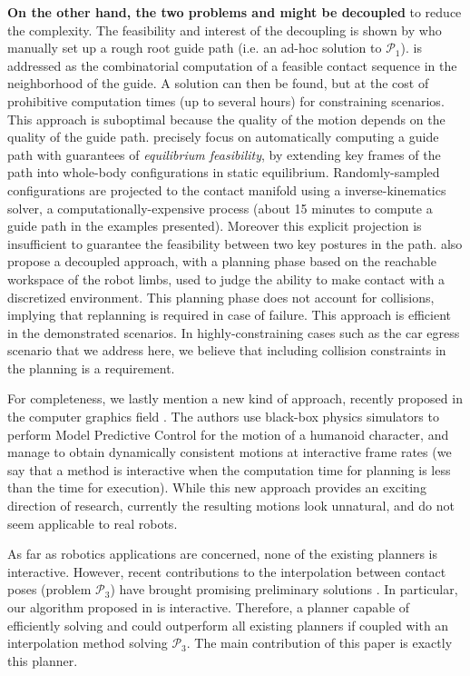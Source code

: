 \textbf{On the other hand, the two problems \Pa and \Pb might be decoupled} to reduce the complexity. The feasibility and interest of the decoupling is shown by \citeauthor{DBLP:conf/iser/EscandeKMG08} who manually set up a rough root guide path (i.e. an ad-hoc solution to $\mathcal{P}_1$). \Pb is addressed as the combinatorial computation of a feasible contact sequence in the neighborhood of the guide. A solution can then be found, %
but at the cost of prohibitive computation times (up to several hours) for constraining scenarios. This approach is suboptimal because the quality of the motion depends on the quality of the guide path. \citeauthor{Bouyarmane2009} precisely focus on automatically computing a guide path with guarantees of \textit{equilibrium feasibility}, by extending key frames of the path into whole-body configurations in static equilibrium. Randomly-sampled configurations are projected to the contact manifold using a inverse-kinematics solver, a computationally-expensive process (about 15 minutes to compute a guide path in the examples presented). Moreover this explicit projection is insufficient to guarantee the feasibility between two key postures in the path. \citeauthor{7140082} also propose a decoupled approach, with a planning phase based on the reachable workspace of the robot limbs, used to judge the ability to make contact with 
a discretized environment. This planning phase does not account for collisions, implying that replanning is required in case of failure. This approach is efficient 
in the demonstrated scenarios. In highly-constraining cases such 
as the car egress scenario that we address here, we believe that including collision constraints in the planning is a requirement.

For completeness, we lastly mention a new kind of approach, recently proposed in the computer graphics field \citep{hamalainen_cpbp_2015}. The authors
use black-box physics simulators to perform Model Predictive Control for the motion of a humanoid character, and manage to obtain dynamically consistent motions
at \gls{interactive} frame rates (we say that a method is interactive when the computation time for planning is less than the
time for execution). While this new approach provides an exciting direction of research, currently the resulting motions
look unnatural, and do not seem applicable to real robots.

As far as robotics applications are concerned, none of the existing planners is \gls{interactive}.
However, recent contributions to the interpolation between contact poses (problem $\mathcal{P}_3$) have brought promising preliminary solutions \citep{Hauser2014, herzog2015trajectory, Park116, Carpentier2016}. In particular, our algorithm proposed in \citeauthor{Carpentier2016} is \gls{interactive}.
Therefore, a planner capable of efficiently solving \Pa and \Pb could outperform all existing planners if coupled with an interpolation method solving $\mathcal{P}_3$.
The main contribution of this paper is exactly this planner.

